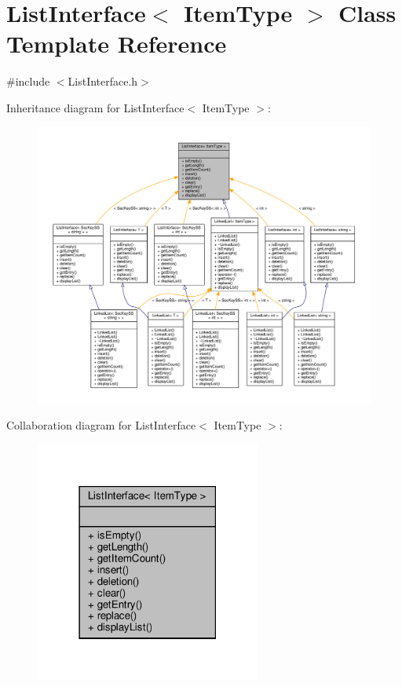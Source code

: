 \hypertarget{classListInterface}{}\section{List\+Interface$<$ Item\+Type $>$ Class Template Reference}
\label{classListInterface}


{\ttfamily \#include $<$List\+Interface.\+h$>$}



Inheritance diagram for List\+Interface$<$ Item\+Type $>$\+:\nopagebreak
\begin{figure}[H]
\begin{center}
\leavevmode
\includegraphics[width=350pt]{classListInterface__inherit__graph}
\end{center}
\end{figure}


Collaboration diagram for List\+Interface$<$ Item\+Type $>$\+:\nopagebreak
\begin{figure}[H]
\begin{center}
\leavevmode
\includegraphics[width=210pt]{classListInterface__coll__graph}
\end{center}
\end{figure}
